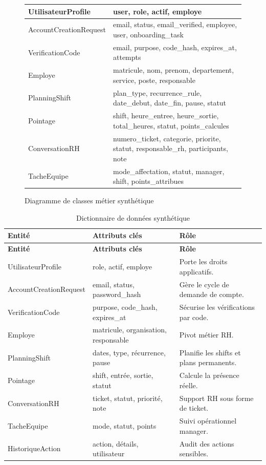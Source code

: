 \documentclass[12pt,a4paper]{report}
\begin{document}
\begin{figure}[h!]
\centering
\renewcommand{\arraystretch}{1.25}
\begin{tabular}{|>{\centering\arraybackslash}p{4cm}|>{\centering\arraybackslash}p{10cm}|}
\hline
UtilisateurProfile & user, role, actif, employe \\ \hline
AccountCreation\newline Request & email, status, email\_verified, employee, user, onboarding\_task \\ \hline
VerificationCode & email, purpose, code\_hash, expires\_at, attempts \\ \hline
Employe & matricule, nom, prenom, departement, service, poste, responsable \\ \hline
PlanningShift & plan\_type, recurrence\_rule, date\_debut, date\_fin, pause, statut \\ \hline
Pointage & shift, heure\_entree, heure\_sortie, total\_heures, statut, points\_calcules \\ \hline
ConversationRH & numero\_ticket, categorie, priorite, statut, responsable\_rh, participants, note \\ \hline
TacheEquipe & mode\_affectation, statut, manager, shift, points\_attribues \\ \hline
\end{tabular}
\caption{Diagramme de classes métier synthétique}
\label{fig:classes}
\end{figure}



\begin{longtable}{>{\raggedright\arraybackslash}p{3.5cm}>{\raggedright\arraybackslash}p{5cm}>{\raggedright\arraybackslash}p{5.5cm}}
\caption{Dictionnaire de données synthétique}\label{tab:dictionnaire}\\
\toprule
\textbf{Entité} & \textbf{Attributs clés} & \textbf{Rôle} \\
\midrule
\endfirsthead
\toprule
\textbf{Entité} & \textbf{Attributs clés} & \textbf{Rôle} \\
\midrule
\endhead
UtilisateurProfile & role, actif, employe & Porte les droits applicatifs. \\
AccountCreation\newline Request & email, status, password\_hash & Gère le cycle de demande de compte. \\
VerificationCode & purpose, code\_hash, expires\_at & Sécurise les vérifications par code. \\
Employe & matricule, organisation, responsable & Pivot métier RH. \\
PlanningShift & dates, type, récurrence, pause & Planifie les shifts et plans permanents. \\
Pointage & shift, entrée, sortie, statut & Calcule la présence réelle. \\
ConversationRH & ticket, statut, priorité, note & Support RH sous forme de ticket. \\
TacheEquipe & mode, statut, points & Suivi opérationnel manager. \\
HistoriqueAction & action, détails, utilisateur & Audit des actions sensibles. \\
\bottomrule
\end{longtable}
\end{document}
